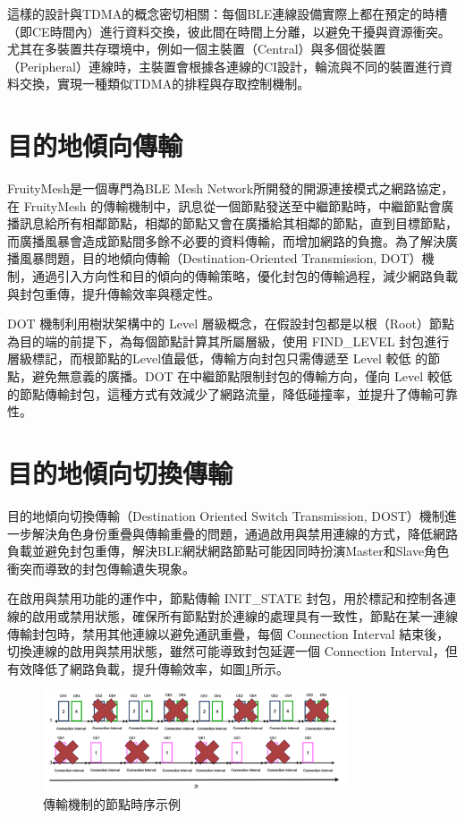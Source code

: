 \begin{ZhChapter}
這樣的設計與TDMA的概念密切相關：每個BLE連線設備實際上都在預定的時槽（即CE時間內）進行資料交換，彼此間在時間上分離，以避免干擾與資源衝突。尤其在多裝置共存環境中，例如一個主裝置（Central）與多個從裝置（Peripheral）連線時，主裝置會根據各連線的CI設計，輪流與不同的裝置進行資料交換，實現一種類似TDMA的排程與存取控制機制。

\section{目的地傾向傳輸}

FruityMesh是一個專門為BLE Mesh Network所開發的開源連接模式之網路協定，在 FruityMesh 的傳輸機制中，訊息從一個節點發送至中繼節點時，中繼節點會廣播訊息給所有相鄰節點，相鄰的節點又會在廣播給其相鄰的節點，直到目標節點，而廣播風暴會造成節點間多餘不必要的資料傳輸，而增加網路的負擔。為了解決廣播風暴問題，目的地傾向傳輸（Destination-Oriented Transmission, DOT）\cite{112TIT00392032}機制，通過引入方向性和目的傾向的傳輸策略，優化封包的傳輸過程，減少網路負載與封包重傳，提升傳輸效率與穩定性。

DOT 機制利用樹狀架構中的 Level 層級概念，在假設封包都是以根（Root）節點為目的端的前提下，為每個節點計算其所屬層級，使用 FIND\_LEVEL 封包進行層級標記，而根節點的Level值最低，傳輸方向封包只需傳遞至 Level 較低 的節點，避免無意義的廣播。DOT 在中繼節點限制封包的傳輸方向，僅向 Level 較低的節點傳輸封包，這種方式有效減少了網路流量，降低碰撞率，並提升了傳輸可靠性。

\section{目的地傾向切換傳輸}

目的地傾向切換傳輸（Destination Oriented Switch Transmission, DOST）\cite{112TIT00392032}機制進一步解決角色身份重疊與傳輸重疊的問題，通過啟用與禁用連線的方式，降低網路負載並避免封包重傳，解決BLE網狀網路節點可能因同時扮演Master和Slave角色衝突而導致的封包傳輸遺失現象。

在啟用與禁用功能的運作中，節點傳輸 INIT\_STATE 封包，用於標記和控制各連線的啟用或禁用狀態，確保所有節點對於連線的處理具有一致性，節點在某一連線傳輸封包時，禁用其他連線以避免通訊重疊，每個 Connection Interval 結束後，切換連線的啟用與禁用狀態，雖然可能導致封包延遲一個 Connection Interval，但有效降低了網路負載，提升傳輸效率，如圖\ref{fig: 傳輸機制的節點時序示例}所示。

\begin{figure}[H]
    \centering
    \includegraphics[width = 0.8\textwidth]{image/傳輸機制的節點時序示例.png}
    \caption{傳輸機制的節點時序示例\cite{112TIT00392032}}
    \label{fig: 傳輸機制的節點時序示例}
\end{figure}


\end{ZhChapter}
